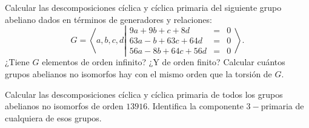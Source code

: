 \begin{ejercicio}\label{ej:7.14}
    Calcular las descomposiciones cíclica y cíclica primaria del siguiente grupo abeliano dados en términos de generadores y relaciones:
    \begin{equation*}
        G = \left\langle a, b, c, d \left|
            \begin{array}{rcl}
                9a + 9b + c + 8d &=& 0 \\
                63a - b + 63c + 64d &=& 0 \\
                56a - 8b + 64c + 56d &=& 0
            \end{array}
        \right.\right\rangle.
    \end{equation*}
    ¿Tiene $G$ elementos de orden infinito? ¿Y de orden finito? Calcular cuántos grupos abelianos no isomorfos hay con el mismo orden que la torsión de $G$.
\end{ejercicio}

\begin{ejercicio}\label{ej:7.15}
    Calcular las descomposiciones cíclica y cíclica primaria de todos los grupos abelianos no isomorfos de orden $13916$. Identifica la componente $3-$primaria de cualquiera de esos grupos.
\end{ejercicio}